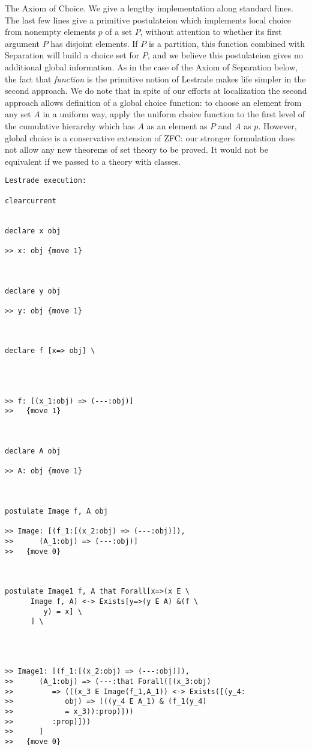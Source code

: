 \documentclass{article}
\begin{document}
The Axiom of Choice.  We give a  lengthy implementation along standard lines.  The last few lines give a primitive postulateion
which implements local choice from nonempty elements $p$ of a set $P$, without attention to whether its first argument $P$ has disjoint elements.  If $P$ is a partition, this function combined
with Separation will build a choice set for $P$, and we believe this postulateion gives no additional global information.  As in the case of the Axiom of Separation below, the fact that {\em function\/} is the primitive notion of Lestrade makes life simpler in the second approach.  We do note that in spite of our efforts at localization the second approach allows definition of a global choice function:  to choose an element from any set $A$ in a uniform way, apply the uniform choice function to the first level of the cumulative hierarchy which has $A$ as an element as $P$ and $A$ as $p$.  However, global choice is a conservative extension of ZFC:  our stronger formulation does not allow any new theorems of set theory to be proved.  It would not be equivalent if we passed to a theory with classes.

\begin{verbatim}Lestrade execution:

clearcurrent


declare x obj

>> x: obj {move 1}



declare y obj

>> y: obj {move 1}



declare f [x=> obj] \
   



>> f: [(x_1:obj) => (---:obj)]
>>   {move 1}



declare A obj

>> A: obj {move 1}



postulate Image f, A obj

>> Image: [(f_1:[(x_2:obj) => (---:obj)]),
>>      (A_1:obj) => (---:obj)]
>>   {move 0}



postulate Image1 f, A that Forall[x=>(x E \
      Image f, A) <-> Exists[y=>(y E A) &(f \
         y) = x] \
      ] \
   



>> Image1: [(f_1:[(x_2:obj) => (---:obj)]),
>>      (A_1:obj) => (---:that Forall([(x_3:obj)
>>         => (((x_3 E Image(f_1,A_1)) <-> Exists([(y_4:
>>            obj) => (((y_4 E A_1) & (f_1(y_4)
>>            = x_3)):prop)]))
>>         :prop)]))
>>      ]
>>   {move 0}


\end{verbatim}
\end{document}
